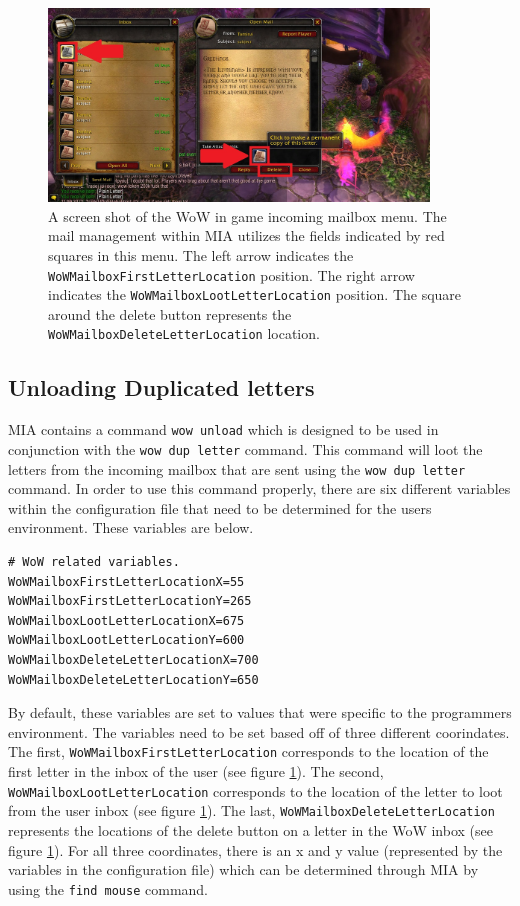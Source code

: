 \begin{figure}[h]
	\centering
	\includegraphics[width=0.9\textwidth]{images/WoWScrnShot_040518_115947b.jpg}
	\caption{A screen shot of the WoW in game incoming mailbox menu. The mail management within MIA utilizes the fields indicated by red squares in this menu. The left arrow indicates the \texttt{WoWMailboxFirstLetterLocation} position. The right arrow indicates the \texttt{WoWMailboxLootLetterLocation} position. The square around the delete button represents the \texttt{WoWMailboxDeleteLetterLocation} location.} \label{wow mailbox receive}
\end{figure}

\subsection{Unloading Duplicated letters}

MIA contains a command \texttt{wow unload} which is designed to be used in conjunction with the \texttt{wow dup letter} command. This command will loot the letters from the incoming mailbox that are sent using the \texttt{wow dup letter} command. In order to use this command properly, there are six different variables within the configuration file that need to be determined for the users environment. These variables are below.

\begin{lstlisting}[style=pythonstyle]
# WoW related variables.
WoWMailboxFirstLetterLocationX=55
WoWMailboxFirstLetterLocationY=265
WoWMailboxLootLetterLocationX=675
WoWMailboxLootLetterLocationY=600
WoWMailboxDeleteLetterLocationX=700
WoWMailboxDeleteLetterLocationY=650
\end{lstlisting}

By default, these variables are set to values that were specific to the programmers environment. The variables need to be set based off of three different coorindates. The first, \texttt{WoWMailboxFirstLetterLocation} corresponds to the location of the first letter in the inbox of the user (see figure \ref{wow mailbox receive}). The second, \texttt{WoWMailboxLootLetterLocation} corresponds to the location of the letter to loot from the user inbox (see figure \ref{wow mailbox receive}). The last, \texttt{WoWMailboxDeleteLetterLocation} represents the locations of the delete button on a letter in the WoW inbox (see figure \ref{wow mailbox receive}).  For all three coordinates, there is an x and y value (represented by the variables in the configuration file) which can be determined through MIA by using the \texttt{find mouse} command.